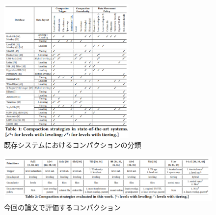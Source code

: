 \documentclass[dvipdfmx,uplatex]{jsarticle}
\theoremstyle{remark}
\begin{document}
\begin{figure}
    \centering
    \includegraphics[width=0.6\textwidth]{img/lsm-compaction/various-compaction-strategy.png}
    \caption{既存システムにおけるコンパクションの分類}
    \label{fig:various-compaction-strategy}
\end{figure}

\begin{figure}
    \centering
    \includegraphics[width=\textwidth]{img/lsm-compaction/target-compaction-strategy.png}
    \caption{今回の論文で評価するコンパクション}
    \label{fig:target-compaction-strategy}
\end{figure}
\end{document}
